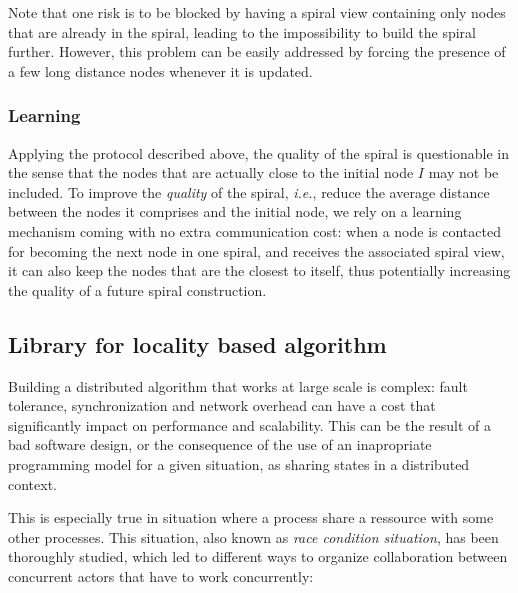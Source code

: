 Note that one risk is to be blocked by having a spiral view containing only
nodes that are already in the spiral, leading to the impossibility to build the
spiral further. However, this problem can be easily addressed by forcing the
presence of a few long distance nodes whenever it is updated.


\subsubsection*{Learning}

Applying the protocol described above, the quality of the spiral is
questionable in the sense that the nodes that are actually close to the initial
node $I$ may not be included.%
%
To improve the \emph{quality} of the spiral, \emph{i.e.}, reduce the average
distance between the nodes it comprises and the initial node, we rely on a
learning mechanism coming with no extra communication cost: when a node is
contacted for becoming the next node in one spiral, and receives the associated
spiral view, it can also keep the nodes that are the closest to itself, thus
potentially increasing the quality of a future spiral construction.


\subsection{Library for locality based algorithm}

Building a distributed algorithm that works at large scale is complex: fault
tolerance, synchronization and network overhead can have a cost that 
significantly impact on performance and scalability. This can be the result of a
bad software design, or the consequence of the use of an inapropriate 
programming model for a given situation, as sharing states in a distributed
context.

This is especially true in situation where a process share a ressource with some 
other processes. This situation, also known as \emph{race condition situation}, 
has been thoroughly studied, which led to different ways to organize 
collaboration between concurrent actors that have to work concurrently:

